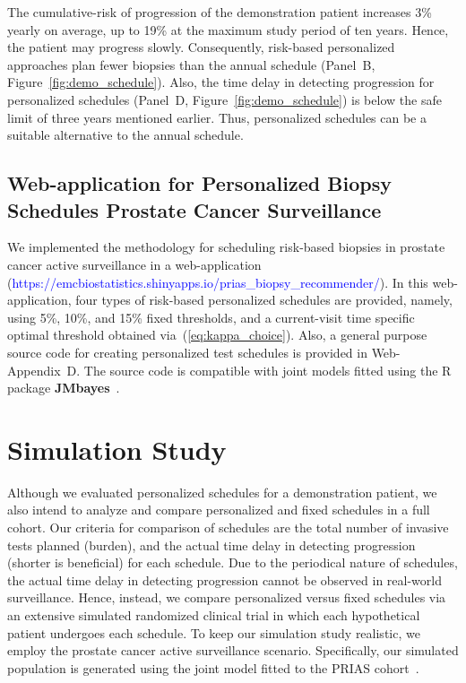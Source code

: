 \documentclass[useAMS, usenatbib, referee]{biom}
\begin{document}
The cumulative-risk of progression of the demonstration patient increases 3\% yearly on average, up to 19\% at the maximum study period of ten years. Hence, the patient may progress slowly. Consequently, risk-based personalized approaches plan fewer biopsies than the annual schedule (Panel~B, Figure~\ref{fig:demo_schedule}). Also, the time delay in detecting progression for personalized schedules (Panel~D, Figure~\ref{fig:demo_schedule}) is below the safe limit of three years mentioned earlier. Thus, personalized schedules can be a suitable alternative to the annual schedule.

\subsection{Web-application for Personalized Biopsy Schedules Prostate Cancer Surveillance}
We implemented the methodology for scheduling risk-based biopsies in prostate cancer active surveillance in a web-application (\textcolor{blue}{https://emcbiostatistics.shinyapps.io/prias\_biopsy\_recommender/}). In this web-application, four types of risk-based personalized schedules are provided, namely, using 5\%, 10\%, and 15\% fixed thresholds, and a current-visit time specific optimal threshold obtained via~(\ref{eq:kappa_choice}). Also, a general purpose source code for creating personalized test schedules is provided in Web-Appendix~D. The source code is compatible with joint models fitted using the R package \textbf{JMbayes}~\citep{rizopoulosJMbayes}.

\section{Simulation Study}
\label{sec:sim_study}
Although we evaluated personalized schedules for a demonstration patient, we also intend to analyze and compare personalized and fixed schedules in a full cohort. Our criteria for comparison of schedules are the total number of invasive tests planned (burden), and the actual time delay in detecting progression (shorter is beneficial) for each schedule. Due to the periodical nature of schedules, the actual time delay in detecting progression cannot be observed in real-world surveillance. Hence, instead, we compare personalized versus fixed schedules via an extensive simulated randomized clinical trial in which each hypothetical patient undergoes each schedule. To keep our simulation study realistic, we employ the prostate cancer active surveillance scenario. Specifically, our simulated population is generated using the joint model fitted to the PRIAS cohort~\citep{tomer2019personalized}.
\end{document}
